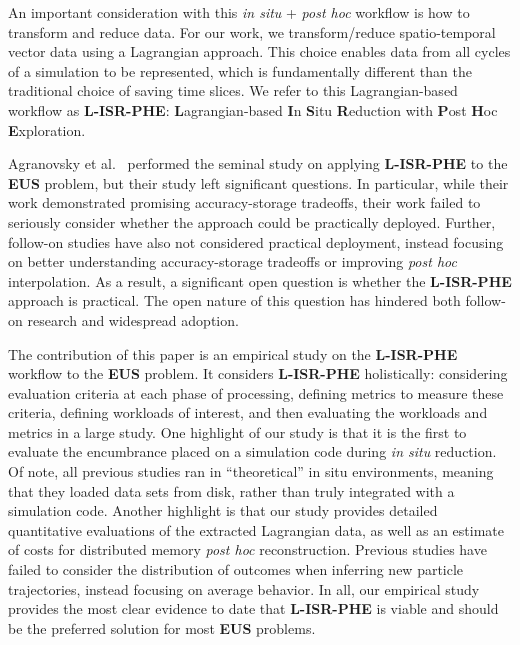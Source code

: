 An important consideration with this \textit{in situ} + \textit{post hoc} workflow is how to transform and reduce data.
%
For our work, we transform/reduce spatio-temporal vector data using a Lagrangian 
approach.
%
This choice enables data from all cycles of a simulation to be represented,
which is fundamentally different than the traditional choice of saving time slices.
%
We refer to this Lagrangian-based workflow as \textbf{L-ISR-PHE}: \textbf{L}agrangian-based \textbf{I}n \textbf{S}itu \textbf{R}eduction with
\textbf{P}ost \textbf{H}oc \textbf{E}xploration.

Agranovsky et al.~\cite{agranovsky2014improved} performed the seminal study on applying 
\textbf{L-ISR-PHE} to the \textbf{EUS} problem, but their study left significant questions.
%
In particular, while their work demonstrated promising accuracy-storage tradeoffs,
their work failed to seriously consider whether the approach could be practically deployed.
%
Further, follow-on studies have also not considered practical deployment, instead focusing
on better understanding accuracy-storage tradeoffs or improving \textit{post hoc} interpolation.
%
As a result, a significant open question is whether the \textbf{L-ISR-PHE} approach is practical.
%
The open nature of this question has hindered both follow-on research and widespread adoption.
%


The contribution of this paper is an empirical study on 
the \textbf{L-ISR-PHE} workflow to the \textbf{EUS} problem.
%
It considers \textbf{L-ISR-PHE} holistically: considering evaluation criteria at each phase of processing,
defining metrics to measure these criteria, defining workloads of interest, and then evaluating
the workloads and metrics in a large study.
%
One highlight of our study is that it is the first
to evaluate the encumbrance placed on a simulation code during \textit{in situ} reduction.
%
Of note, all previous studies ran in ``theoretical'' in situ environments, meaning that
they loaded data sets from disk, rather than truly integrated with a simulation code.
%
Another highlight is that our study provides detailed quantitative evaluations of the extracted 
Lagrangian data, as well as an estimate of costs for distributed 
memory \textit{post hoc} reconstruction.
%
Previous studies have failed to consider the distribution of outcomes when inferring new particle trajectories,
instead focusing on average behavior.
%
In all, our empirical study provides
the most clear evidence to date that \textbf{L-ISR-PHE} is viable and 
should be the preferred solution for most \textbf{EUS} problems.
%
%


